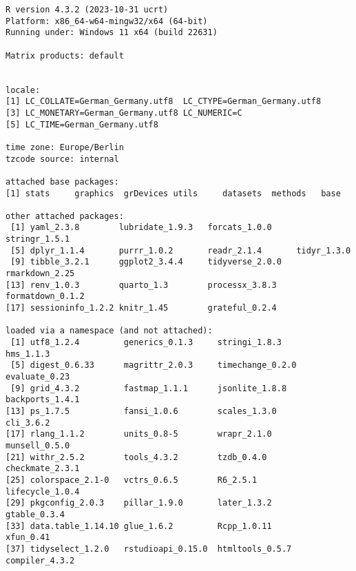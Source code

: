 \documentclass[
  letterpaper,
  DIV=11,
  numbers=noendperiod]{scrartcl}
\begin{document}
\begin{verbatim}
R version 4.3.2 (2023-10-31 ucrt)
Platform: x86_64-w64-mingw32/x64 (64-bit)
Running under: Windows 11 x64 (build 22631)

Matrix products: default


locale:
[1] LC_COLLATE=German_Germany.utf8  LC_CTYPE=German_Germany.utf8   
[3] LC_MONETARY=German_Germany.utf8 LC_NUMERIC=C                   
[5] LC_TIME=German_Germany.utf8    

time zone: Europe/Berlin
tzcode source: internal

attached base packages:
[1] stats     graphics  grDevices utils     datasets  methods   base     

other attached packages:
 [1] yaml_2.3.8        lubridate_1.9.3   forcats_1.0.0     stringr_1.5.1    
 [5] dplyr_1.1.4       purrr_1.0.2       readr_2.1.4       tidyr_1.3.0      
 [9] tibble_3.2.1      ggplot2_3.4.4     tidyverse_2.0.0   rmarkdown_2.25   
[13] renv_1.0.3        quarto_1.3        processx_3.8.3    formatdown_0.1.2 
[17] sessioninfo_1.2.2 knitr_1.45        grateful_0.2.4   

loaded via a namespace (and not attached):
 [1] utf8_1.2.4         generics_0.1.3     stringi_1.8.3      hms_1.1.3         
 [5] digest_0.6.33      magrittr_2.0.3     timechange_0.2.0   evaluate_0.23     
 [9] grid_4.3.2         fastmap_1.1.1      jsonlite_1.8.8     backports_1.4.1   
[13] ps_1.7.5           fansi_1.0.6        scales_1.3.0       cli_3.6.2         
[17] rlang_1.1.2        units_0.8-5        wrapr_2.1.0        munsell_0.5.0     
[21] withr_2.5.2        tools_4.3.2        tzdb_0.4.0         checkmate_2.3.1   
[25] colorspace_2.1-0   vctrs_0.6.5        R6_2.5.1           lifecycle_1.0.4   
[29] pkgconfig_2.0.3    pillar_1.9.0       later_1.3.2        gtable_0.3.4      
[33] data.table_1.14.10 glue_1.6.2         Rcpp_1.0.11        xfun_0.41         
[37] tidyselect_1.2.0   rstudioapi_0.15.0  htmltools_0.5.7    compiler_4.3.2    
\end{verbatim}
\end{document}
